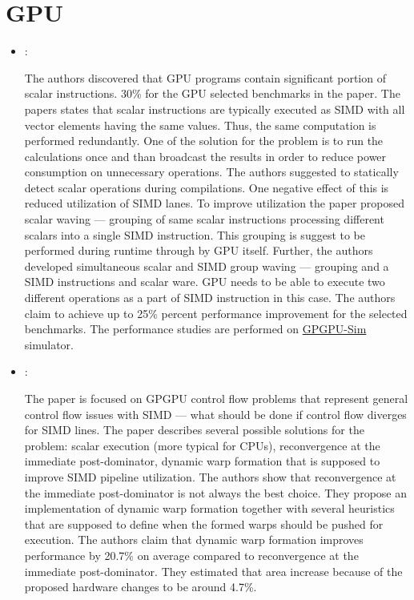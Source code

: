 \section*{GPU}
\begin{itemize}
    \item \cite{Yilmazer:ScalarWaving:2014}:

    The authors discovered that GPU programs contain significant portion of scalar instructions. 30\% for the GPU selected benchmarks in the paper. The papers states that scalar instructions are typically executed as SIMD with all vector elements having the same values. Thus, the same computation is performed redundantly. One of the solution for the problem is to run the calculations once and than broadcast the results in order to reduce power consumption on unnecessary operations. The authors suggested to statically detect scalar operations during compilations. One negative effect of this is reduced utilization of SIMD lanes. To improve utilization the  paper proposed scalar waving --- grouping of same scalar instructions processing different scalars into a single SIMD instruction. This grouping is suggest to be performed during runtime through by GPU itself. Further, the authors developed simultaneous scalar and SIMD group waving --- grouping and a SIMD instructions and scalar ware. GPU needs to be able to execute two different operations as a part of SIMD instruction in this case. The authors claim to achieve up to 25\% percent performance improvement for the selected benchmarks. The performance studies are performed on \href{https://github.com/gpgpu-sim}{GPGPU-Sim} simulator.

    \item \cite{Fung:DynamicWrapGPUControlFlow:2007}:

    The paper is focused on GPGPU control flow problems that represent general control flow issues with SIMD --- what should be done if control flow diverges for SIMD lines. The paper describes several possible solutions for the problem: scalar execution (more typical for CPUs), reconvergence at the immediate post-dominator, dynamic warp formation that is supposed to improve SIMD pipeline utilization. The authors show that reconvergence at the immediate post-dominator is not always the best choice. They propose an implementation of dynamic warp formation together with several heuristics that are supposed to define when the formed warps should be pushed for execution. The authors claim that dynamic warp formation improves performance by 20.7\% on average compared to reconvergence at the immediate post-dominator. They estimated that area increase because of the proposed hardware changes to be around 4.7\%.
\end{itemize}

